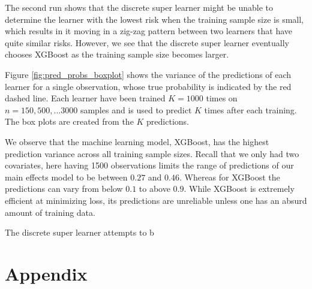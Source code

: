 \documentclass[11pt, a4paper]{article}
\theoremstyle{definition}
\theoremstyle{remark}
\begin{document}
The second run shows that the discrete super learner might be unable to determine the learner with the lowest risk when the training sample size is small, which results in it moving in a zig-zag pattern between two learners that have quite similar risks. However, we see that the discrete super learner eventually chooses XGBoost as the training sample size becomes larger.  

Figure \ref{fig:pred_probs_boxplot} shows the variance of the predictions of each learner for a single observation, whose true probability is indicated by the red dashed line. Each learner have been trained $ K = 1000 $ times on $ n = 150, 500, \dots 3000 $ samples and is used to predict $ K $ times after each training. The box plots are created from the $ K $ predictions. 

We observe that the machine learning model, XGBoost, has the highest prediction variance across all training sample sizes. Recall that we only had two covariates, here having 1500 observations limits the range of predictions of our main effects model to be between $ 0.27 $ and $ 0.46 $. Whereas for XGBoost the predictions can vary from below $ 0.1 $ to above $ 0.9 $. While XGBoost is extremely efficient at minimizing loss, its predictions are unreliable unless one has an absurd amount of training data. 

The discrete super learner attempts to b 

\section{Appendix}
\end{document}
